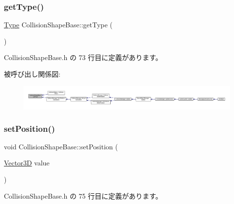 \subsubsection{\texorpdfstring{get\+Type()}{getType()}}
{\footnotesize\ttfamily \mbox{\hyperlink{class_collision_shape_base_a8abcef092855ad0ca191047044b002cb}{Type}} Collision\+Shape\+Base\+::get\+Type (\begin{DoxyParamCaption}{ }\end{DoxyParamCaption})\hspace{0.3cm}{\ttfamily [inline]}}



 Collision\+Shape\+Base.\+h の 73 行目に定義があります。

被呼び出し関係図\+:
\nopagebreak
\begin{figure}[H]
\begin{center}
\leavevmode
\includegraphics[width=350pt]{class_collision_shape_base_a662af47ebcd9f29d7c54047a0227b8bc_icgraph}
\end{center}
\end{figure}
\mbox{\label{class_collision_shape_base_ac14132139e486926df11f438a8600907}} 
\subsubsection{\texorpdfstring{set\+Position()}{setPosition()}}
{\footnotesize\ttfamily void Collision\+Shape\+Base\+::set\+Position (\begin{DoxyParamCaption}\item[{\mbox{\hyperlink{class_vector3_d}{Vector3D}}}]{value }\end{DoxyParamCaption})\hspace{0.3cm}{\ttfamily [inline]}}



 Collision\+Shape\+Base.\+h の 75 行目に定義があります。

